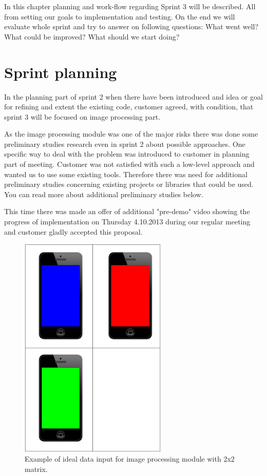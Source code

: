 In this chapter planning and work-flow regarding Sprint 3 will be described. 
All from setting our goals to implementation and testing. On the end we will evaluate whole sprint and try to answer on following questions: What went well? What could be improved? What should we start doing?  

\section{Sprint planning}
In the planning part of sprint 2 when there have been introduced and idea or goal for refining and extent the existing code, customer agreed, with condition, that sprint 3 will be focused on image processing part.

As the image processing module was one of the major risks there was done some preliminary studies research even in sprint 2 about possible approaches.
One specific way to deal with the problem was introduced to customer in planning part of meeting.
Customer was not satisfied with such a low-level approach and wanted us to use some existing tools.
Therefore there was need for additional preliminary studies concerning existing projects or libraries that could be used.
You can read more about additional preliminary studies below.

This time there was made an offer of additional "pre-demo" video showing the progress of implementation on Thursday 4.10.2013 during our regular meeting and customer gladly accepted this proposal.


\begin{figure}[H]
	\centering
		\includegraphics[width=7cm]{sprint3/sprint3_goal.pdf}
	\caption{Example of ideal data input for image processing module with 2x2 matrix.}
	\label{img:sprint3_goal}
\end{figure}

